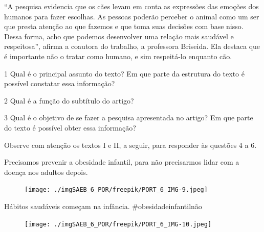 \begin{myquote}
``A pesquisa evidencia que os cães levam em conta as expressões das
emoções dos humanos para fazer escolhas. As pessoas poderão perceber o
animal como um ser que presta atenção ao que fazemos e que toma suas
decisões com base nisso. Dessa forma, acho que podemos desenvolver uma
relação mais saudável e respeitosa'', afirma a coautora do trabalho, a
professora Briseida. Ela destaca que é importante não o tratar como
humano, e sim respeitá-lo enquanto cão.


\end{myquote}

\num{1} Qual é o principal assunto do texto? Em que parte da estrutura
do texto é possível constatar essa informação?


\num{2} Qual é a função do subtítulo do artigo?


\num{3} Qual é o objetivo de se fazer a pesquisa apresentada no artigo?
Em que parte do texto é possível obter essa informação?



Observe com atenção os textos I e II, a seguir, para responder às
questões 4 a 6.

\begin{myquote}

Precisamos prevenir a obesidade infantil, para não precisarmos lidar com a doença nos adultos depois.
\begin{figure}[H]
\centering\texttt{[image: ./imgSAEB\_6\_POR/freepik/PORT\_6\_IMG-9.jpeg]}
\end{figure}

Hábitos saudáveis começam na infância. \#obesidadeinfantilnão
\begin{figure}[H]
\centering\texttt{[image: ./imgSAEB\_6\_POR/freepik/PORT\_6\_IMG-10.jpeg]}
\end{figure}

\end{myquote}

